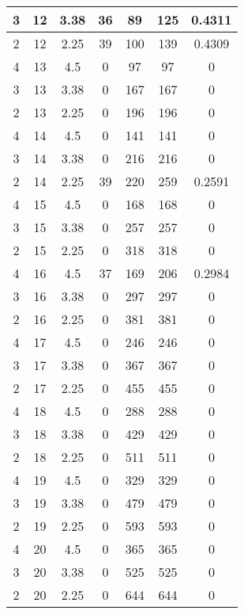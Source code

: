 \documentclass[letterpaper, 12pt]{article}
\begin{document}
\begin{longtable}{|c|c|c|c|c|c|c|}
\hline
3 & 12 & 3.38 & 36 & 89 & 125 & 0.4311 \\
\hline
2 & 12 & 2.25 & 39 & 100 & 139 & 0.4309 \\
\hline
4 & 13 & 4.5 & 0 & 97 & 97 & 0 \\
\hline
3 & 13 & 3.38 & 0 & 167 & 167 & 0 \\
\hline
2 & 13 & 2.25 & 0 & 196 & 196 & 0 \\
\hline
4 & 14 & 4.5 & 0 & 141 & 141 & 0 \\
\hline
3 & 14 & 3.38 & 0 & 216 & 216 & 0 \\
\hline
2 & 14 & 2.25 & 39 & 220 & 259 & 0.2591 \\
\hline
4 & 15 & 4.5 & 0 & 168 & 168 & 0 \\
\hline
3 & 15 & 3.38 & 0 & 257 & 257 & 0 \\
\hline
2 & 15 & 2.25 & 0 & 318 & 318 & 0 \\
\hline
4 & 16 & 4.5 & 37 & 169 & 206 & 0.2984 \\
\hline
3 & 16 & 3.38 & 0 & 297 & 297 & 0 \\
\hline
2 & 16 & 2.25 & 0 & 381 & 381 & 0 \\
\hline
4 & 17 & 4.5 & 0 & 246 & 246 & 0 \\
\hline
3 & 17 & 3.38 & 0 & 367 & 367 & 0 \\
\hline
2 & 17 & 2.25 & 0 & 455 & 455 & 0 \\
\hline
4 & 18 & 4.5 & 0 & 288 & 288 & 0 \\
\hline
3 & 18 & 3.38 & 0 & 429 & 429 & 0 \\
\hline
2 & 18 & 2.25 & 0 & 511 & 511 & 0 \\
\hline
4 & 19 & 4.5 & 0 & 329 & 329 & 0 \\
\hline
3 & 19 & 3.38 & 0 & 479 & 479 & 0 \\
\hline
2 & 19 & 2.25 & 0 & 593 & 593 & 0 \\
\hline
4 & 20 & 4.5 & 0 & 365 & 365 & 0 \\
\hline
3 & 20 & 3.38 & 0 & 525 & 525 & 0 \\
\hline
2 & 20 & 2.25 & 0 & 644 & 644 & 0 \\
\hline
\end{longtable}
\end{document}
